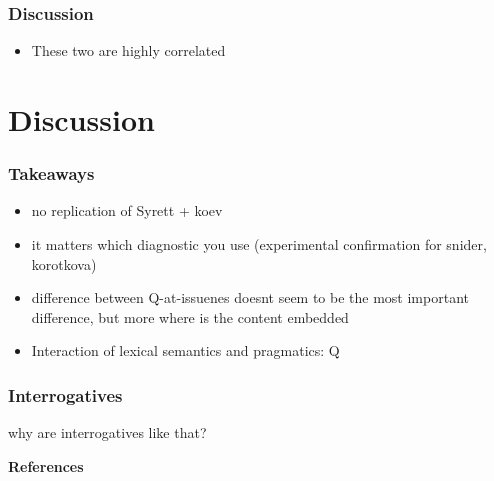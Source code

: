 \documentclass[compress, xcolor = dvipsnames, aspectratio=169]{beamer}
\begin{document}
	\begin{frame}[t]\frametitle{Discussion}
		
		\begin{itemize}
			\item These two are highly correlated 
		\end{itemize}

	\end{frame}	

\section{Discussion}
	
	\begin{frame}[t]\frametitle{Takeaways}
	
		\begin{itemize}
			\item no replication of Syrett + koev
			\item it matters which diagnostic you use (experimental confirmation for snider, korotkova)
			\item difference between Q-at-issuenes doesnt seem to be the most important difference, but more where is the content embedded 
			\item Interaction of lexical semantics and pragmatics: Q
		\end{itemize}
	
	\end{frame}

	\begin{frame}[t]\frametitle{Interrogatives}
	
		why are interrogatives like that?
	
	\end{frame}

\begin{frame}[allowframebreaks]{\bfseries\opt References}
	\footnotesize
	
	

\end{frame}
\end{document}
